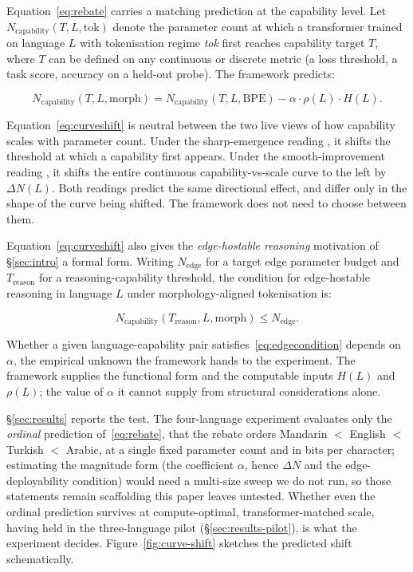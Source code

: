 Equation~\ref{eq:rebate} carries a matching prediction at the capability level. Let $N_{\mathrm{capability}}(T, L, \mathrm{tok})$ denote the parameter count at which a transformer trained on language $L$ with tokenisation regime \textit{tok} first reaches capability target $T$, where $T$ can be defined on any continuous or discrete metric (a loss threshold, a task score, accuracy on a held-out probe). The framework predicts:

\begin{equation}
N_{\mathrm{capability}}(T, L, \mathrm{morph}) = N_{\mathrm{capability}}(T, L, \mathrm{BPE}) - \alpha \cdot \rho(L) \cdot H(L).
\label{eq:curveshift}
\end{equation}

Equation~\ref{eq:curveshift} is neutral between the two live views of how capability scales with parameter count. Under the sharp-emergence reading \citep{wei2022}, it shifts the threshold at which a capability first appears. Under the smooth-improvement reading \citep{schaeffer2023}, it shifts the entire continuous capability-vs-scale curve to the left by $\Delta N(L)$. Both readings predict the same directional effect, and differ only in the shape of the curve being shifted. The framework does not need to choose between them.

Equation~\ref{eq:curveshift} also gives the \emph{edge-hostable reasoning} motivation of \S\ref{sec:intro} a formal form. Writing $N_{\mathrm{edge}}$ for a target edge parameter budget and $T_{\mathrm{reason}}$ for a reasoning-capability threshold, the condition for edge-hostable reasoning in language $L$ under morphology-aligned tokenisation is:

\begin{equation}
N_{\mathrm{capability}}(T_{\mathrm{reason}}, L, \mathrm{morph}) \le N_{\mathrm{edge}}.
\label{eq:edgecondition}
\end{equation}

Whether a given language-capability pair satisfies~\ref{eq:edgecondition} depends on $\alpha$, the empirical unknown the framework hands to the experiment. The framework supplies the functional form and the computable inputs $H(L)$ and $\rho(L)$; the value of $\alpha$ it cannot supply from structural considerations alone.

\S\ref{sec:results} reports the test. The four-language experiment evaluates only the \emph{ordinal} prediction of~\ref{eq:rebate}, that the rebate orders Mandarin $<$ English $<$ Turkish $<$ Arabic, at a single fixed parameter count and in bits per character; estimating the magnitude form (the coefficient $\alpha$, hence $\Delta N$ and the edge-deployability condition) would need a multi-size sweep we do not run, so those statements remain scaffolding this paper leaves untested. Whether even the ordinal prediction survives at compute-optimal, transformer-matched scale, having held in the three-language pilot (\S\ref{sec:results-pilot}), is what the experiment decides. Figure~\ref{fig:curve-shift} sketches the predicted shift schematically.

